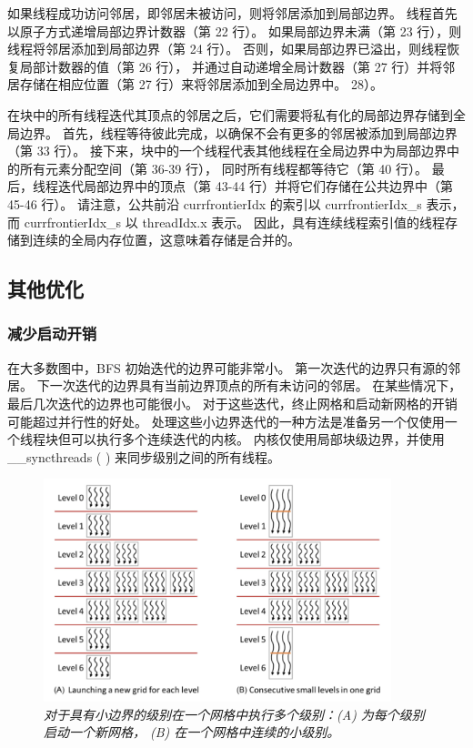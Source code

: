 如果线程成功访问邻居，即邻居未被访问，则将邻居添加到局部边界。 线程首先以原子方式递增局部边界计数器（第 22 行）。 
如果局部边界未满（第 23 行），则线程将邻居添加到局部边界（第 24 行）。 
否则，如果局部边界已溢出，则线程恢复局部计数器的值（第 26 行），
并通过自动递增全局计数器（第 27 行）并将邻居存储在相应位置（第 27 行）来将邻居添加到全局边界中。 28）。

在块中的所有线程迭代其顶点的邻居之后，它们需要将私有化的局部边界存储到全局边界。 
首先，线程等待彼此完成，以确保不会有更多的邻居被添加到局部边界（第 33 行）。 
接下来，块中的一个线程代表其他线程在全局边界中为局部边界中的所有元素分配空间（第 36-39 行），
同时所有线程都等待它（第 40 行）。 
最后，线程迭代局部边界中的顶点（第 43-44 行）并将它们存储在公共边界中（第 45-46 行）。 
请注意，公共前沿 currfrontierIdx 的索引以 currfrontierIdx\_s 表示，而 currfrontierIdx\_s 以 threadIdx.x 表示。 
因此，具有连续线程索引值的线程存储到连续的全局内存位置，这意味着存储是合并的。

\subsection{其他优化}
\subsubsection{减少启动开销}
在大多数图中，BFS 初始迭代的边界可能非常小。 第一次迭代的边界只有源的邻居。 
下一次迭代的边界具有当前边界顶点的所有未访问的邻居。 在某些情况下，最后几次迭代的边界也可能很小。 
对于这些迭代，终止网格和启动新网格的开销可能超过并行性的好处。 
处理这些小边界迭代的一种方法是准备另一个仅使用一个线程块但可以执行多个连续迭代的内核。 
内核仅使用局部块级边界，并使用 \_\_syncthreads ( ) 来同步级别之间的所有线程。

\begin{figure}[H]
	\centering
	\includegraphics[width=0.9\textwidth]{figs/F15.16.png}
	\caption{\textit{对于具有小边界的级别在一个网格中执行多个级别：(A) 为每个级别启动一个新网格，
	(B) 在一个网格中连续的小级别。}}
\end{figure}

